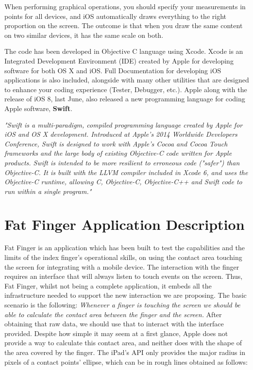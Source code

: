 When performing graphical operations, you should specify your measurements in points for all devices, and iOS automatically draws everything to the right proportion on the screen.  The outcome is that when you draw the same content on two similar devices, it has the same scale on both. 

The   code   has   been   developed in Objective C language using Xcode. Xcode is an Integrated Development Environment (IDE)  created by Apple for developing software for both OS X and iOS. Full Documentation for developing iOS applications is also included, alongside with many other utilities that are designed to enhance your coding experience (Tester, Debugger, etc.). Apple along with the release of iOS 8, last June, also released a new programming language for coding Apple software, \textbf{Swift}.

\emph{"Swift is a multi-paradigm, compiled programming language created by Apple for iOS and OS X development. Introduced at Apple's 2014 Worldwide Developers Conference, Swift is designed to work with Apple's Cocoa and Cocoa Touch frameworks and the large body of existing Objective-C code written for Apple products. Swift is intended to be more resilient to erroneous code ("safer") than Objective-C. It is built with the LLVM compiler included in Xcode 6, and uses the Objective-C runtime, allowing C, Objective-C, Objective-C++ and Swift code to run within a single program."} \cite{wikiSwift}












\section{Fat Finger Application Description}


Fat Finger is an application which has been built to test the capabilities and the limits of the index finger's operational skills, on using the contact area touching the screen for integrating with a mobile device. The interaction with the finger requires an interface that will always listen to touch events on the screen. Thus, Fat Finger, whilst not being a complete application, it embeds all the infrastructure needed to support the new interaction we are proposing. The basic scenario is the following:
 \emph{Whenever a finger is touching the screen we should be able to calculate the contact area between the finger and the screen.} After obtaining that raw data, we should use that to interact with the interface provided. Despite how simple it may seem at a first glance, Apple does not provide a way to calculate this contact area, and neither does with the shape of the area covered by the finger. The iPad’s API only provides the major radius in pixels of a contact points' ellipse, which can be in rough lines obtained as follows:



